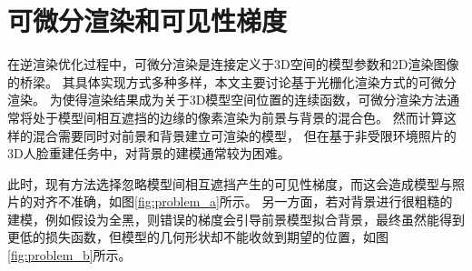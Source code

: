 \section{可微分渲染和可见性梯度}

在逆渲染优化过程中，可微分渲染是连接定义于3D空间的模型参数和2D渲染图像的桥梁。
其具体实现方式多种多样，本文主要讨论基于光栅化渲染方式的可微分渲染。
为使得渲染结果成为关于3D模型空间位置的连续函数，可微分渲染方法通常将处于模型间相互遮挡的边缘的像素渲染为前景与背景的混合色。
然而计算这样的混合需要同时对前景和背景建立可渲染的模型，
但在基于非受限环境照片的3D人脸重建任务中，对背景的建模通常较为困难。

此时，现有方法选择忽略模型间相互遮挡产生的可见性梯度，而这会造成模型与照片的对齐不准确，如图\ref{fig:problem_a}所示。
另一方面，若对背景进行很粗糙的建模，例如假设为全黑，则错误的梯度会引导前景模型拟合背景，最终虽然能得到更低的损失函数，但模型的几何形状却不能收敛到期望的位置，如图\ref{fig:problem_b}所示。

